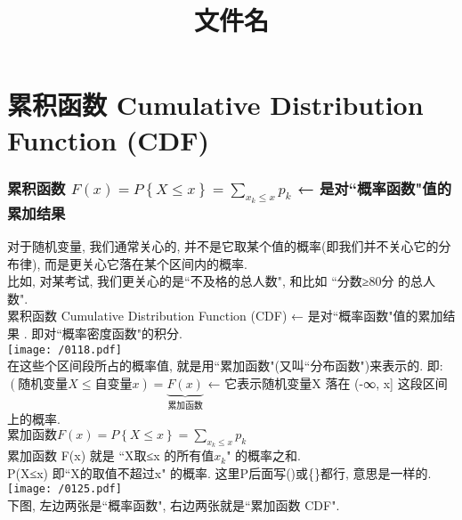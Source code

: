 \documentclass[UTF8]{ctexart}
\title{文件名}
\begin{document}
	\tableofcontents %
	\date{} %
	\maketitle  %
	
	
	\part{累积函数 Cumulative Distribution Function (CDF)}
	
	
	\section{累积函数 $ \boxed{	F\left( x \right) =P\left\{ X\leq x \right\} =\sum_{x_k\leq x}^{}{p_k}}$  ← 是对``概率函数"值的累加结果}
	
	
	对于随机变量, 我们通常关心的, 并不是它取某个值的概率(即我们并不关心它的分布律), 而是更关心它落在某个区间内的概率.  \\
	比如, 对某考试, 我们更关心的是``不及格的总人数", 和比如 ``分数≥80分 的总人数". \\
	
	
	累积函数 Cumulative Distribution Function (CDF) ← 是对``概率函数"值的累加结果 . 即对``概率密度函数"的积分.  \\
	
	\texttt{[image: /0118.pdf]} \\
	
	
	在这些个区间段所占的概率值, 就是用``累加函数"(又叫``分布函数")来表示的. 即: \\
	$ (\text{随机变量}X\leq \text{自变量}x)=\underset{\text{累加函数}}{\underbrace{F(x)}}
	$ ← 它表示随机变量X 落在 (-∞, x] 这段区间上的概率. \\
	
	$\boxed{
		\text{累加函数} F\left( x \right) =P\left\{ X\leq x \right\} =\sum_{x_k\leq x}^{}{p_k}
	}$ \\
	
	累加函数 F(x) 就是 ``X取≤x 的所有值$x_k$" 的概率之和. \\
	P(X≤x) 即``X的取值不超过x" 的概率. 这里P后面写()或\{\}都行, 意思是一样的. \\
	
	
	\texttt{[image: /0125.pdf]} \\
	
	
	
	
	下图, 左边两张是``概率函数", 右边两张就是``累加函数 CDF". \\
	
\end{document}
